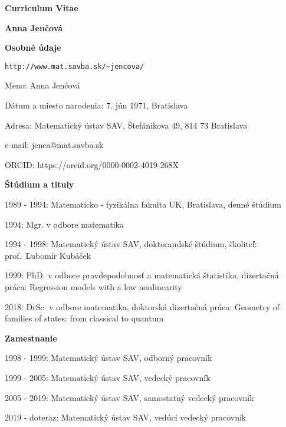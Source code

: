 \documentclass[12pt]{article}
\begin{document}
\centerline{\large \textbf{Curriculum Vitae}}
\vskip 5pt
\centerline{\large \textbf{Anna Jen\v cov\'a}}
\vskip 0.5cm
\noindent
\textbf{Osobné údaje}


\begin{verbatim}http://www.mat.savba.sk/~jencova/\end{verbatim}




\begin{description}[noitemsep,leftmargin=3cm, font=\normalfont]
\item{Meno:} Anna Jen\v cov\'a
\item{Dátum a miesto narodenia:} 7. jún 1971,  Bratislava
\item{Adresa:} Matematický ústav SAV, \v Stef\'anikova 49, 814 73 Bratislava
\item{e-mail:} jenca@mat.savba.sk
\vskip 5pt
\item{ORCID:}   https://orcid.org/0000-0002-4019-268X 

\end{description}

\noindent
\textbf{\v Stúdium a tituly}
\begin{description}[noitemsep,leftmargin=2.6cm, font=\normalfont]
\item{1989 - 1994:} Matematicko - fyzikálna fakulta UK,  Bratislava, denné štúdium 
\item{1994:} Mgr. v odbore matematika
\item{1994 - 1998:} Matematický ústav SAV, doktorandské štúdium, školiteľ: prof.~Ľubomír Kub\'a\v cek
\item{1999:} PhD. v odbore pravdepodobnosť a matematická štatistika, dizertačná práca: Regression models with a low nonlinearity
\item{2018:} DrSc. v odbore matematika, doktorská dizertačná práca: Geometry of families of states: from classical to quantum 

\end{description}

\noindent
\textbf{Zamestnanie}
\begin{description}[noitemsep,leftmargin=3cm, font=\normalfont]
\item{1998 - 1999:} Matematický ústav SAV, odborný pracovník
\item{1999 - 2005:} Matematický ústav SAV, vedecký pracovník
\item{2005 - 2019:} Matematický ústav SAV, samostatný vedecký pracovník
\item{2019 - doteraz:} Matematický ústav SAV, vedúci vedecký pracovník
\end{description}
\end{document}
